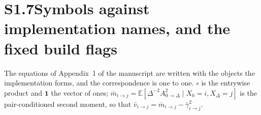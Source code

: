 \documentclass[11pt]{article}
\begin{document}
\section*{S1.7\quad Symbols against implementation names, and the fixed build flags}


The equations of Appendix~1 of the manuscript are written with the objects the implementation forms,
and the correspondence is one to one. $\circ$ is the entrywise product and $\mathbf{1}$ the vector of
ones; $\overline{m}_{i\to j}=\mathbb{E}[\Delta^{-2}A^2_{0\to\Delta}\mid X_0=i,X_\Delta=j]$ is the
pair-conditioned second moment, so that
$\bar{v}_{i\to j}=\overline{m}_{i\to j}-\bar{\gamma}^2_{i\to j}$.
\end{document}
